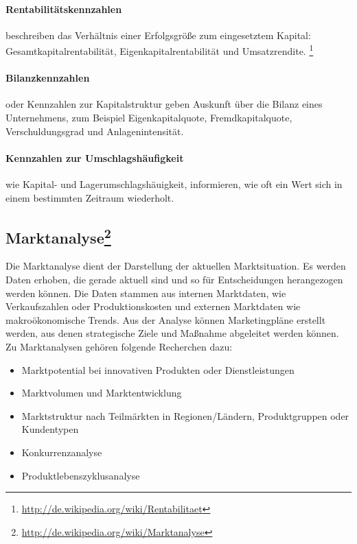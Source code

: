 \paragraph{Rentabilitätskennzahlen} beschreiben das Verhältnis einer Erfolgsgröße zum eingesetztem Kapital: Gesamtkapitalrentabilität, Eigenkapitalrentabilität und Umsatzrendite. \footnote{\url{http://de.wikipedia.org/wiki/Rentabilitaet}}

\paragraph{Bilanzkennzahlen} oder Kennzahlen zur Kapitalstruktur geben Auskunft über die Bilanz eines Unternehmens, zum Beispiel Eigenkapitalquote, Fremdkapitalquote, Verschuldungsgrad und Anlagenintensität.

\paragraph{Kennzahlen zur Umschlagshäufigkeit} wie Kapital- und Lagerum\-schlags\-häuigkeit, informieren, wie oft ein Wert sich in einem bestimmten Zeitraum wiederholt.
    
 



\subsection[Marktanalyse]{Marktanalyse\footnote{\url{http://de.wikipedia.org/wiki/Marktanalyse}}}

Die Marktanalyse dient der Darstellung der aktuellen Marktsituation. Es werden Daten erhoben, die gerade aktuell sind und so für Entscheidungen herangezogen werden können. Die Daten stammen aus internen Marktdaten, wie Verkaufszahlen oder Produktionskosten und externen Marktdaten wie makroökonomische Trends. Aus der Analyse können Marketingpläne erstellt werden, aus denen strategische Ziele und Maßnahme abgeleitet werden können.
\\
Zu Marktanalysen gehören folgende Recherchen dazu:
\begin{itemize}
	\item Marktpotential bei innovativen Produkten oder Dienstleistungen
	\item Marktvolumen und Marktentwicklung
	\item Marktstruktur nach Teilmärkten in Regionen/Ländern, Produktgruppen oder Kundentypen
	\item Konkurrenzanalyse
	\item Produktlebenszyklusanalyse 
\end{itemize}



